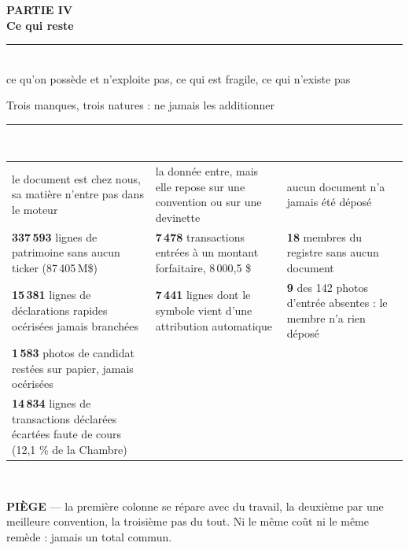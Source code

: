 \documentclass[11pt,aspectratio=169]{beamer}
\newcommand{\badge}[2]{\colorbox{#1}{\textcolor{white}{\footnotesize\textbf{#2}}}}
\newcommand{\defl}[1]{{\scriptsize\color{black!55}#1}}
\newcommand{\piege}[1]{%
  \colorbox{warnorange!12}{\parbox{\dimexpr\linewidth-8pt}{\scriptsize
    \textbf{\textcolor{warnorange}{PIÈGE}}\; --- #1}}}
\newcommand{\chapdivider}[3]{%
  \begin{frame}[plain]
    \centering\vfill
    {\color{helec!85}\large\textbf{#1}}\\[3.5mm]
    {\color{black!88}\fontsize{29}{33}\selectfont\textbf{#2}}\\[4mm]
    {\color{helec!45}\rule{0.30\textwidth}{1.2pt}}\\[4mm]
    {\color{black!55}\large #3}
    \vfill
  \end{frame}}
\begin{document}
\chapdivider{PARTIE IV}{Ce qui reste}{ce qu'on possède et n'exploite pas, ce qui est fragile, ce qui n'existe pas}

\begin{frame}{Trois manques, trois natures : ne jamais les additionner}
  \centering
  {\scriptsize\begin{tabular}{>{\raggedright\arraybackslash}p{} >{\raggedright\arraybackslash}p{} >{\raggedright\arraybackslash}p{}}
    \toprule
    \badge{dataC}{ON LE POSSÈDE} & \badge{warnorange}{C'EST FRAGILE} & \badge{alertred}{ÇA N'EXISTE PAS}\\
    \midrule
    le document est chez nous, sa matière n'entre pas dans le moteur
      & la donnée entre, mais elle repose sur une convention ou sur une devinette
      & aucun document n'a jamais été déposé\\[1.5mm]
    \textbf{337\,593} lignes de patrimoine sans aucun ticker (87\,405\,M\$)
      & \textbf{7\,478} transactions entrées à un montant forfaitaire, 8\,000,5 \$
      & \textbf{18} membres du registre sans aucun document\\[1.2mm]
    \textbf{15\,381} lignes de déclarations rapides océrisées jamais branchées
      & \textbf{7\,441} lignes dont le symbole vient d'une attribution automatique
      & \textbf{9} des 142 photos d'entrée absentes : le membre n'a rien déposé\\[1.2mm]
    \textbf{1\,583} photos de candidat restées sur papier, jamais océrisées
      & &\\[1.2mm]
    \textbf{14\,834} lignes de transactions déclarées écartées faute de cours \defl{(12,1 \% de la Chambre)}
      & &\\
    \bottomrule
  \end{tabular}}\\[3mm]
  \piege{la première colonne se répare avec du travail, la deuxième par une meilleure convention,
  la troisième pas du tout. Ni le même coût ni le même remède : jamais un total commun.}
\end{frame}


\end{document}
